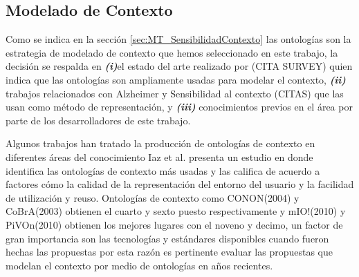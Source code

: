 \subsection{Modelado de Contexto}
\label{subsec:Prop_Modelado}

Como se indica en la sección \ref{sec:MT_SensibilidadContexto} las ontologías son la estrategia de modelado de contexto que hemos seleccionado en este trabajo, la decisión se respalda en \textbf{\textit{(i)}}el estado del arte realizado por (CITA SURVEY) \cite{Iaz2014} quien indica que las ontologías son ampliamente usadas para modelar el contexto, \textbf{\textit{(ii)}} trabajos relacionados con Alzheimer y Sensibilidad al contexto (CITAS) que las usan como método de representación, y \textbf{\textit{(iii)}} conocimientos previos en el área por parte de los desarrolladores de este trabajo.

Algunos trabajos han tratado la producción de ontologías de contexto en diferentes áreas del conocimiento \cite{Iaz2014} Iaz et al. presenta un estudio en donde identifica las ontologías de contexto más usadas y las califica de acuerdo a factores cómo la calidad de la representación del entorno del usuario y la facilidad de utilización y reuso. Ontologías de contexto como CONON(2004) y CoBrA(2003) obtienen el cuarto y sexto puesto respectivamente y mIO!(2010) y PiVOn(2010) obtienen los mejores lugares con el noveno y decimo, un factor de gran importancia son las tecnologías y estándares disponibles cuando fueron hechas las propuestas por esta razón es pertinente evaluar las propuestas que modelan el contexto por medio de ontologías en años recientes.

